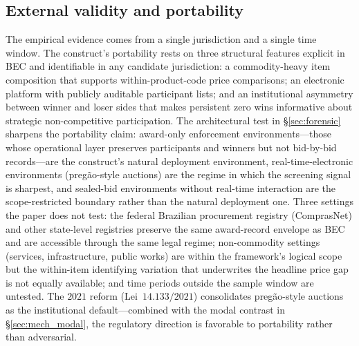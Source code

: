 \subsection{External validity and portability}
\label{sec:lim_external}

The empirical evidence comes from a single jurisdiction and a
single time window. The construct's portability rests on three
structural features explicit in BEC and identifiable in any
candidate jurisdiction: a commodity-heavy item composition that
supports within-product-code price comparisons; an electronic
platform with publicly auditable participant lists; and an
institutional asymmetry between winner and loser sides that makes
persistent zero wins informative about strategic non-competitive
participation. The architectural test in \S\ref{sec:forensic}
sharpens the portability claim: award-only enforcement
environments---those whose operational layer preserves
participants and winners but not bid-by-bid records---are the
construct's natural deployment environment, real-time-electronic
environments (preg\~ao-style auctions) are the regime in which
the screening signal is sharpest, and sealed-bid environments
without real-time interaction are the scope-restricted boundary
rather than the natural deployment one. Three settings the paper
does not test: the federal Brazilian procurement registry
(ComprasNet) and other state-level registries preserve the same
award-record envelope as BEC and are accessible through the same
legal regime; non-commodity settings (services, infrastructure,
public works) are within the framework's logical scope but the
within-item identifying variation that underwrites the headline
price gap is not equally available; and time periods outside the
sample window are untested. The $2021$ reform
(Lei~$14.133/2021$) consolidates preg\~ao-style auctions as the
institutional default---combined with the modal contrast in
\S\ref{sec:mech_modal}, the regulatory direction is favorable to
portability rather than adversarial.
